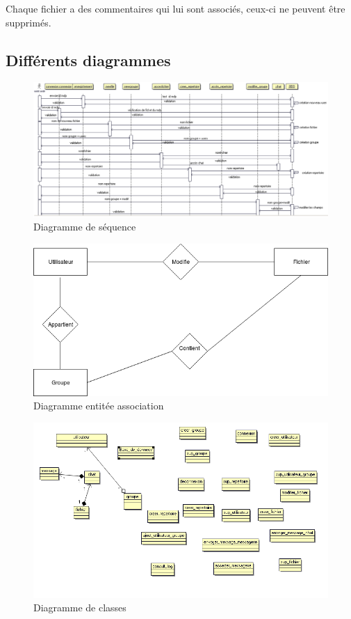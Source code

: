 \documentclass[a4paper, 12pt]{article}
\begin{document}
Chaque fichier a des commentaires qui lui sont associés, ceux-ci ne peuvent être supprimés.

\subsection{Différents diagrammes}
\begin{figure}[H]
  \begin{center}
    \includegraphics[scale=0.4]{sequence.pdf}
  \end{center}
  \caption{Diagramme de séquence}
\end{figure}
\begin{figure}[H]
  \begin{center}
    \includegraphics[scale=0.7]{EntiteAssociationBDD.png}
  \end{center}
  \caption{Diagramme entitée association}
\end{figure}
\begin{figure}[H]
  \begin{center}
    \includegraphics[scale=0.7]{Diagramme_classe.png}
  \end{center}
  \caption{Diagramme de classes}
\end{figure}
\end{document}

